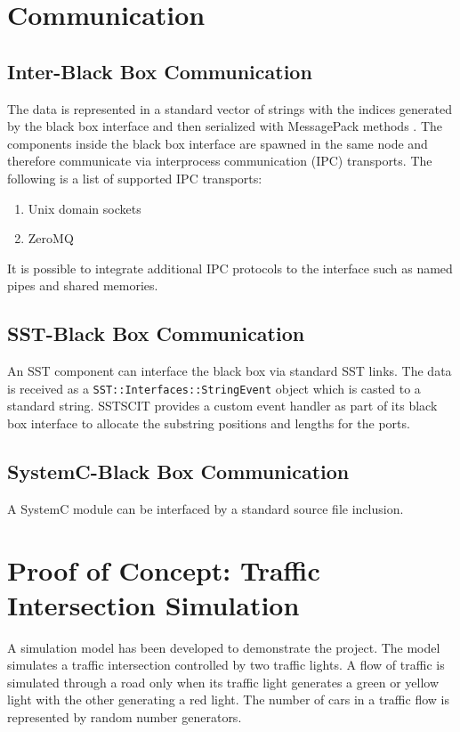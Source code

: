\documentclass{article}
\begin{document}
  \section{Communication}

    \subsection{Inter-Black Box Communication} \label{sec:ipc}
    The data is represented in a standard vector of strings with the indices generated by the black
    box interface and then serialized with MessagePack methods \cite{msgpack}. The components inside
    the black box interface are spawned in the same node and therefore communicate via interprocess
    communication (IPC) transports. The following is a list of supported IPC transports:
    \begin{enumerate}
      \item Unix domain sockets
      \item ZeroMQ
    \end{enumerate}

    It is possible to integrate additional IPC protocols to the interface such as named pipes and
    shared memories.

    \subsection{SST-Black Box Communication}
    An SST component can interface the black box via standard SST links. The data is received as a
    \lstinline{SST::Interfaces::StringEvent} object which is casted to a standard string. SSTSCIT
    provides a custom event handler as part of its black box interface to allocate the substring
    positions and lengths for the ports.

    \subsection{SystemC-Black Box Communication}
    A SystemC module can be interfaced by a standard source file inclusion.

  \section{Proof of Concept: Traffic Intersection Simulation}
  A simulation model has been developed to demonstrate the project. The model simulates a traffic
  intersection controlled by two traffic lights. A flow of traffic is simulated through a road only
  when its traffic light generates a green or yellow light with the other generating a red light.
  The number of cars in a traffic flow is represented by random number generators.
\end{document}
